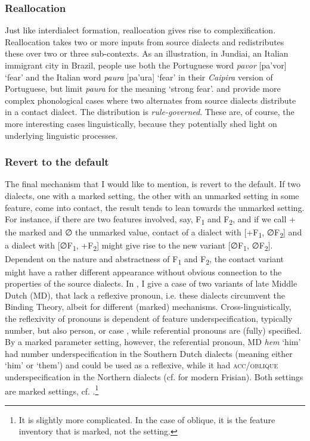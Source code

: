 \documentclass[output=paper,hidelinks,draftmode]{langscibook}
\begin{document}
\subsubsection{Reallocation}\label{sec:postma:2.2.3}


Just like interdialect formation, reallocation gives rise to complexification. Reallocation takes two or more inputs from source dialects and redistributes these over two or three sub-contexts. As an illustration, in Jundiai, an Italian immigrant city in Brazil, people use both the Portuguese word \textit{pavor} [pa'vor] `fear' and the Italian word \textit{paura} [pa'ura] `fear' in their \textit{Caipira} version of Portuguese, but limit \textit{paura} for the meaning `strong fear'. \citet{Britain1997} and \citet{Taeldeman1989} provide more complex phonological cases where two alternates from source dialects distribute in a contact dialect. The distribution is \textit{rule-governed}. These are, of course, the more interesting cases linguistically, because they potentially shed light on underlying linguistic processes.


 \subsubsection{Revert to the default}\label{revert}


The final mechanism that I would like to mention, is revert to the default. If two dialects, one with a marked setting, the other with an unmarked setting in some feature, come into contact, the result tends to lean towards the unmarked setting. For instance, if there are two features involved, say, F\textsubscript{1} and F\textsubscript{2}, and if we call + the marked and ∅ the unmarked value, contact of a dialect with [+F\textsubscript{1}, ∅F\textsubscript{2}] and a dialect with [∅F\textsubscript{1}, +F\textsubscript{2}] might give rise to the new variant [∅F\textsubscript{1}, ∅F\textsubscript{2}]. Dependent on the nature and abstractness of F\textsubscript{1} and F\textsubscript{2}, the contact variant might have a rather different appearance without obvious connection to the properties of the source dialects. In \citet{Postma2004, Postma2011}, I give a case of two variants of late Middle Dutch (MD), that lack a reflexive pronoun, i.e. these dialects circumvent the Binding Theory, albeit for different (marked) mechanisms. Cross-linguistically, the reflexivity of pronouns is dependent of feature underspecification, typically number, but also person, or case \citep{Reuland1995}, while referential pronouns are (fully) specified. By a marked parameter setting, however, the referential pronoun, MD \textit{hem} `him' had number underspecification in the Southern Dutch dialects (meaning either `him' or `them') and could be used as a reflexive, while it had \textsc{acc}/\textsc{oblique} underspecification in the Northern dialects (cf. \citealt{Hoekstra1994} for modern Frisian). Both settings are marked settings, cf. .\footnote{It is slightly more complicated. In the case of oblique, it is the feature inventory that is marked, not the setting.}
\end{document}
